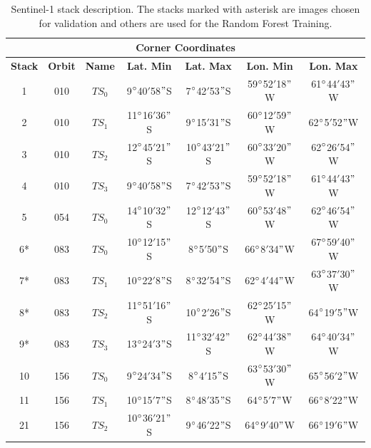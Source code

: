 \begin{table}[H]
    \centering
    \begin{tabular}{|c|c|c||c|c|c|c|}
        \hline  
        \multicolumn{7}{|c|}{Corner Coordinates} \\ 
        \hline \hline
        \textbf{Stack} & \textbf{Orbit} &\textbf{Name} &\textbf{Lat. Min} &\textbf{Lat. Max} &\textbf{Lon. Min} &\textbf{Lon. Max} \\
        \hline
        1&010&$TS_0$ &9$\degree$40$'$58$"$S &7$\degree$42$'$53$"$S &59$\degree$52$'$18$"$W &61$\degree$44$'$43$"$W \\
        2&010&$TS_1$ &11$\degree$16$'$36$"$S &9$\degree$15$'$31$"$S &60$\degree$12$'$59$"$W &62$\degree$5$'$52$"$W \\
        3&010&$TS_2$ &12$\degree$45$'$21$"$S &10$\degree$43$'$21$"$S &60$\degree$33$'$20$"$W &62$\degree$26$'$54$"$W \\
        4&010&$TS_3$ &9$\degree$40$'$58$"$S &7$\degree$42$'$53$"$S &59$\degree$52$'$18$"$W &61$\degree$44$'$43$"$W \\
        5&054&$TS_0$ &14$\degree$10$'$32$"$S &12$\degree$12$'$43$"$S &60$\degree$53$'$48$"$W &62$\degree$46$'$54$"$W \\
        6*&083&$TS_0$&10$\degree$12$'$15$"$S &8$\degree$5$'$50$"$S &66$\degree$8$'$34$"$W &67$\degree$59$'$40$"$W \\
        7*&083&$TS_1$&10$\degree$22$'$8$"$S &8$\degree$32$'$54$"$S &62$\degree$4$'$44$"$W &63$\degree$37$'$30$"$W \\
        8*&083&$TS_2$&11$\degree$51$'$16$"$S &10$\degree$2$'$26$"$S &62$\degree$25$'$15$"$W &64$\degree$19$'$5$"$W \\
        9*&083&$TS_3$&13$\degree$24$'$3$"$S &11$\degree$32$'$42$"$S &62$\degree$44$'$38$"$W &64$\degree$40$'$34$"$W \\
        10&156&$TS_0$&9$\degree$24$'$34$"$S &8$\degree$4$'$15$"$S &63$\degree$53$'$30$"$W &65$\degree$56$'$2$"$W \\
        11&156&$TS_1$&10$\degree$15$'$7$"$S &8$\degree$48$'$35$"$S &64$\degree$5$'$7$"$W &66$\degree$8$'$22$"$W \\
        21&156&$TS_2$&10$\degree$36$'$21$"$S &9$\degree$46$'$22$"$S &64$\degree$9$'$40$"$W &66$\degree$19$'$6$"$W \\
        \hline
    \end{tabular}
    \caption{Sentinel-1 stack description. The stacks marked with asterisk are images chosen for validation and others are used for the Random Forest Training.}
    \label{tab:sentinelStackTable}
\end{table}

